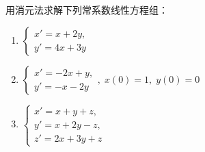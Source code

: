 \documentclass[lang=cn,11pt]{elegantbook}
\begin{document}
\begin{exercise}[基础：消元法练习]
用消元法求解下列常系数线性方程组：
\begin{enumerate}
  \item[(1)]
  $\begin{cases}x'=x+2y,\\y'=4x+3y\end{cases}$
  \item[(2)]
  $\begin{cases}x'=-2x+y,\\ y'=-x-2y\end{cases},\;
  x(0)=1,\;y(0)=0$
  \item[(3)]
  $\begin{cases}x'=x+y+z,\\ y'=x+2y-z,\\ z'=2x+3y+z\end{cases}$
\end{enumerate}
\end{exercise}
\end{document}
